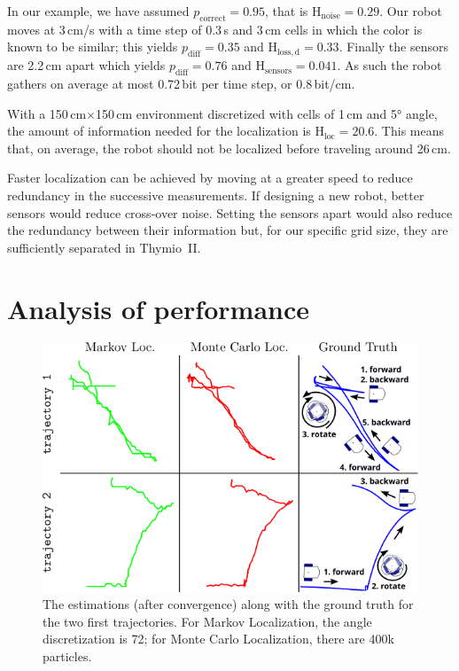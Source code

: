 \documentclass[letterpaper, 10pt, conference]{ieeeconf}
\newcommand{\ent}[1]{\mathrm{H}_\mathrm{#1}} %
\begin{document}
In our example, we have assumed $p_\mathrm{correct}=0.95$, that is $\ent{noise}=0.29$.
Our robot moves at 3\,cm/s with a time step of 0.3\,s and 3\,cm cells in which the color is known to be similar; this yields $p_\mathrm{diff}=0.35$ and $\ent{loss,d}=0.33$.
Finally the sensors are 2.2\,cm apart which yields $p_\mathrm{diff}=0.76$ and $\ent{sensors}=0.041$.
As such the robot gathers on average at most 0.72\,bit per time step, or 0.8\,bit/cm.

With a 150\,cm$\times$150\,cm environment discretized with cells of 1\,cm and 5° angle, the amount of information needed for the localization is $\ent{loc}=20.6$.
This means that, on average, the robot should not be localized before traveling around 26\,cm.

Faster localization can be achieved by moving at a greater speed to reduce redundancy in the successive measurements.
If designing a new robot, better sensors would reduce cross-over noise.
Setting the sensors apart would also reduce the redundancy between their information but, for our specific grid size, they are sufficiently separated in Thymio~II.

\section{Analysis of performance}

\begin{figure}
\includegraphics{trajectories}
\caption{The estimations (after convergence) along with the ground truth for the two first trajectories.
For Markov Localization, the angle discretization is 72; for Monte Carlo Localization, there are 400k particles.
}
\label{fig:trajectories}
\end{figure}
\end{document}
